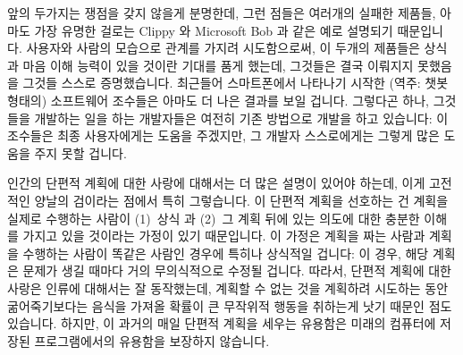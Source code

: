 앞의 두가지는 쟁점을 갖지 않을게 분명한데, 그런 점들은 여러개의 실패한 제품들,
아마도 가장 유명한 걸로는 Clippy 와 Microsoft Bob 과 같은 예로 설명되기
때문입니다.
사용자와 사람의 모습으로 관계를 가지려 시도함으로써, 이 두개의 제품들은 상식과
마음 이해 능력이 있을 것이란 기대를 품게 했는데, 그것들은 결국 이뤄지지
못했음을 그것들 스스로 증명했습니다.
최근들어 스마트폰에서 나타나기 시작한 (역주: 챗봇 형태의) 소프트웨어 조수들은
아마도 더 나은 결과를 보일 겁니다.
그렇다곤 하나, 그것들을 개발하는 일을 하는 개발자들은 여전히 기존 방법으로
개발을 하고 있습니다: 이 조수들은 최종 사용자에게는 도움을 주겠지만, 그 개발자
스스로에게는 그렇게 많은 도움을 주지 못할 겁니다.

인간의 단편적 계획에 대한 사랑에 대해서는 더 많은 설명이 있어야 하는데, 이게
고전적인 양날의 검이라는 점에서 특히 그렇습니다.
이 단편적 계획을 선호하는 건 계획을 실제로 수행하는 사람이 (1)~상식
과 (2)~그 계획 뒤에 있는 의도에 대한 충분한 이해를 가지고 있을 것이라는 가정이
있기 때문입니다.
이 가정은 계획을 짜는 사람과 계획을 수행하는 사람이 똑같은 사람인 경우에 특히나
상식적일 겁니다: 이 경우, 해당 계획은 문제가 생길 때마다 거의 무의식적으로
수정될 겁니다.
따라서, 단편적 계획에 대한 사랑은 인류에 대해서는 잘 동작했는데, 계획할 수 없는
것을 계획하려 시도하는 동안 굶어죽기보다는 음식을 가져올 확률이 큰 무작위적
행동을 취하는게 낫기 때문인 점도 있습니다.
하지만, 이 과거의 매일 단편적 계획을 세우는 유용함은 미래의 컴퓨터에 저장된
프로그램에서의 유용함을 보장하지 않습니다.


